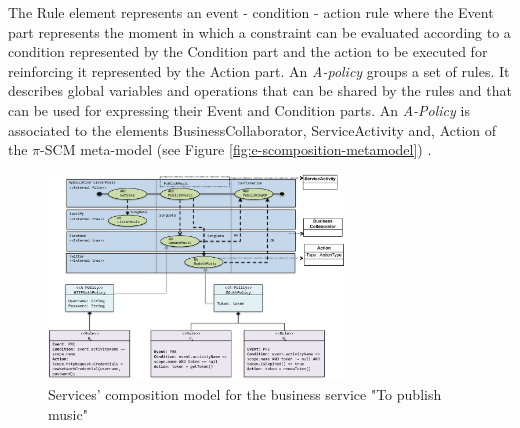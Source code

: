 The {\sc Rule} element represents an event - condition - action rule where the {\sc Event} part represents the moment in which a constraint  can be evaluated according to a condition represented by the {\sc Condition} part and the  action  to be executed for reinforcing  it represented by the {\sc Action} part. 
An {\em A-policy} groups a set of rules. It describes global variables and operations that can be shared by the rules and that can be used for expressing their Event  and Condition parts. An {\em A-Policy} is associated to the elements {\sc BusinessCollaborator}, {\sc ServiceActivity} and, {\sc Action}  of the $\pi$-SCM meta-model (see Figure \ref{fig:e-scomposition-metamodel}) . 

\begin{figure}[htpb]
\centering
\includegraphics[width=0.70\textwidth]{figs/e-composition-model}
\caption{Services' composition model for the business service "To publish music"}
\label{fig:servicecompositionmodel}
\end{figure}

